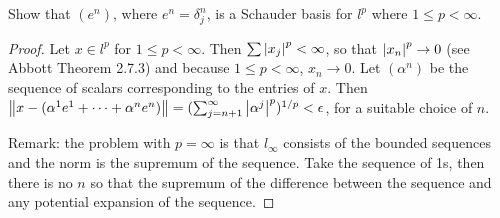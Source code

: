 \begin{exercise}{11}
Show that $(e^n)$, where $e^n=\delta^n_j$, is a Schauder basis for $l^p$ where $1\leq p<\infty$.
\end{exercise}
\begin{proof}
Let $x\in l^p$ for $1\leq p<\infty$. Then $\sum \left\lvert x_j\right\rvert^p<\infty$, so that $\left\lvert x_n\right\rvert^p\to 0$ (see Abbott Theorem 2.7.3) and because $1\leq p<\infty$, $x_n\to 0$. Let $(\alpha^n)$ be the sequence of scalars corresponding to the entries of $x$. Then $\left\lVert x-(\alpha^1e^1+\dots+\alpha^ne^n)\right\rVert=(\sum^\infty_{j=n+1}\left\lvert \alpha^j\right\rvert^p)^{1/p}<\epsilon$, for a suitable choice of $n$. 

Remark: the problem with $p=\infty$ is that $l_\infty$ consists of the bounded sequences and the norm is the supremum of the sequence. Take the sequence of 1s, then there is no $n$ so that the supremum of the difference between the sequence and any potential expansion of the sequence.
\end{proof}
